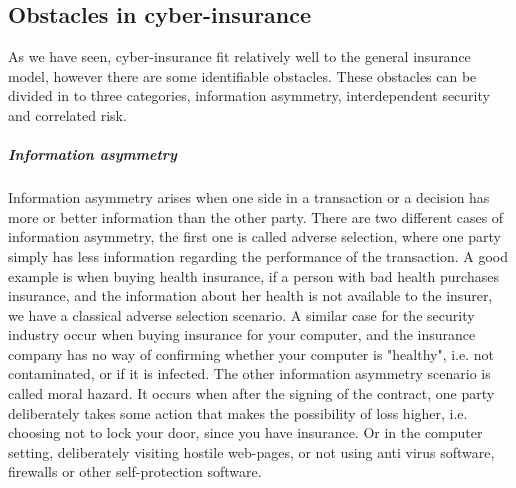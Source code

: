 \subsection{Obstacles in cyber-insurance}
\label{threemainobstacles}
As we have seen, cyber-insurance fit relatively well to the general insurance model, however there are some identifiable obstacles. These obstacles can be divided in to three categories, information asymmetry, interdependent security and  correlated risk. 
\subparagraph{Information asymmetry}
Information asymmetry arises when one side in a transaction or a decision has more or better
 information than the other party. There are two different cases of information asymmetry, the first
  one is called adverse selection, where one party simply has less information regarding the performance of
   the transaction. A good example is when buying health insurance, if a person with bad health purchases
    insurance, and the information about her health is not available to the insurer, we have a
     classical adverse selection scenario. A similar case for the security industry occur when buying
      insurance for your computer, and the insurance company has no way of confirming whether your
       computer is "healthy", i.e. not contaminated, or if it is infected. 
The other information asymmetry scenario is called moral hazard. It occurs when after the signing of
 the contract, one party deliberately takes some action that makes the possibility of loss higher,
  i.e. choosing not to lock your door, since you have insurance. Or in the computer setting,
   deliberately visiting hostile web-pages, or not using anti virus software, firewalls or other self-protection software.
    \cite{solutiontoinfoasym}
    
